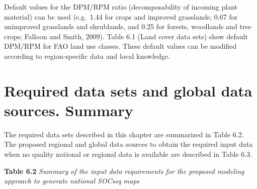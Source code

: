 \documentclass[
  10pt,
  b5paper,
]{book}
\begin{document}
Default values for the DPM/RPM ratio (decomposability of incoming plant material) can be used (e.g.~1.44 for crops and improved grasslands; 0.67 for unimproved grasslands and shrublands, and 0.25 for forests, woodlands and tree crops; Falloon and Smith, 2009). Table 6.1 (Land cover data sets) show default DPM/RPM for FAO land use classes. These default values can be modified according to region-specific data and local knowledge.

\hypertarget{required-data-sets-and-global-data-sources.-summary}{%
\section{Required data sets and global data sources. Summary}\label{required-data-sets-and-global-data-sources.-summary}}

The required data sets described in this chapter are summarized in Table 6.2. The proposed regional and global data sources to obtain the required input data when no quality national or regional data is available are described in Table 6.3.

\textbf{Table 6.2} \emph{Summary of the input data requirements for the proposed modeling approach to generate national SOCseq maps}
\end{document}
